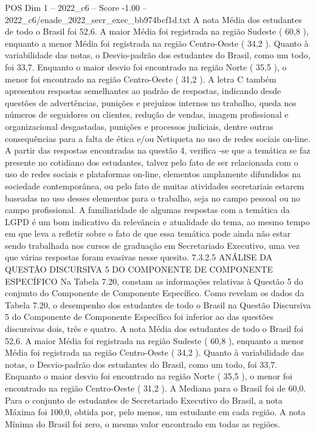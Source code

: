 \begin{textsample}{POS Dim 1 – 2022\_c6 – Score -1.00 – 2022\_c6/enade\_2022\_secr\_exec\_bb974bcf1d.txt}
A nota Média dos estudantes de todo o Brasil foi 52,6.
A maior Média foi registrada na região Sudeste ( 60,8 ), enquanto a menor Média foi registrada na região Centro-Oeste ( 34,2 ).
Quanto à variabilidade das notas, o Desvio-padrão dos estudantes do Brasil, como um todo, foi 33,7.
Enquanto o maior desvio foi encontrado na região Norte ( 35,5 ), o menor foi encontrado na região Centro-Oeste ( 31,2 ).
A letra C também apresentou respostas semelhantes ao padrão de respostas, indicando desde questões de advertências, punições e prejuízos internos no trabalho, queda nos números de seguidores ou clientes, redução de vendas, imagem profissional e organizacional desgastadas, punições e processos judiciais, dentre outras consequências para a falta de ética e/ou Netiqueta no uso de redes sociais on-line.
A partir das respostas encontradas na questão 4, verifica -se que a temática se faz presente no cotidiano dos estudantes, talvez pelo fato de ser relacionada com o uso de redes sociais e plataformas on-line, elementos amplamente difundidos na sociedade contemporânea, ou pelo fato de muitas atividades secretariais estarem baseadas no uso desses elementos para o trabalho, seja no campo pessoal ou no campo profissional.
A familiaridade de algumas respostas com a temática da LGPD é um bom indicativo da relevância e atualidade do tema, ao mesmo tempo em que leva a refletir sobre o fato de que essa temática pode ainda não estar sendo trabalhada nos cursos de graduação em Secretariado Executivo, uma vez que várias respostas foram evasivas nesse quesito. 7.3.2.5 ANÁLISE DA QUESTÃO DISCURSIVA 5 DO COMPONENTE DE COMPONENTE ESPECÍFICO Na Tabela 7.20, constam as informações relativas à Questão 5 do conjunto do Componente de Componente Específico.
Como revelam os dados da Tabela 7.20, o desempenho dos estudantes de todo o Brasil na Questão Discursiva 5 do Componente de Componente Específico foi inferior ao das questões discursivas dois, três e quatro.
A nota Média dos estudantes de todo o Brasil foi 52,6.
A maior Média foi registrada na região Sudeste ( 60,8 ), enquanto a menor Média foi registrada na região Centro-Oeste ( 34,2 ).
Quanto à variabilidade das notas, o Desvio-padrão dos estudantes do Brasil, como um todo, foi 33,7.
Enquanto o maior desvio foi encontrado na região Norte ( 35,5 ), o menor foi encontrado na região Centro-Oeste ( 31,2 ).
A Mediana para o Brasil foi de 60,0.
Para o conjunto de estudantes de Secretariado Executivo do Brasil, a nota Máxima foi 100,0, obtida por, pelo menos, um estudante em cada região.
A nota Mínima do Brasil foi zero, o mesmo valor encontrado em todas as regiões.

\end{textsample}
